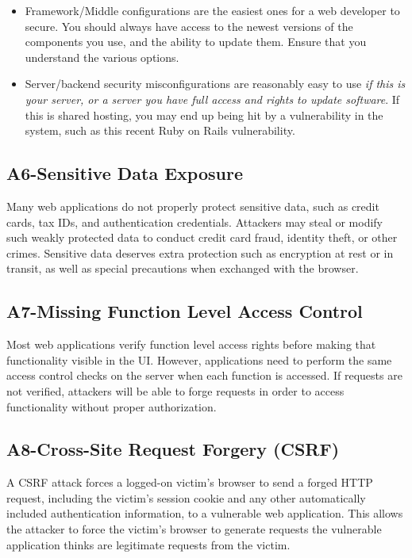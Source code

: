 \begin{itemize}
\item Framework/Middle configurations are the easiest ones for a web developer to secure. You should always have access to the newest versions of the components you use, and the ability to update them. Ensure that you understand the various options.
\item Server/backend security misconfigurations are reasonably easy to use \emph{if this is your server, or a server you have full access and rights to update software}. If this is shared hosting, you may end up being hit by a vulnerability in the system, such as this recent Ruby on Rails vulnerability\citep{RoR2013Vuln}.
\end{itemize}

\subsection{A6-Sensitive Data Exposure}
\noindent
Many web applications do not properly protect sensitive data, such as credit cards, tax IDs, and authentication credentials. Attackers may steal or modify such weakly protected data to conduct credit card fraud, identity theft, or other crimes. Sensitive data deserves extra protection such as encryption at rest or in transit, as well as special precautions when exchanged with the browser.

\subsection{A7-Missing Function Level Access Control}
\noindent
Most web applications verify function level access rights before making that functionality visible in the UI. However, applications need to perform the same access control checks on the server when each function is accessed. If requests are not verified, attackers will be able to forge requests in order to access functionality without proper authorization.

\subsection{A8-Cross-Site Request Forgery (CSRF)}
\noindent
A CSRF attack forces a logged-on victim’s browser to send a forged HTTP request, including the victim’s session cookie and any other automatically included authentication information, to a vulnerable web application. This allows the attacker to force the victim’s browser to generate requests the vulnerable application thinks are legitimate requests from the victim.


